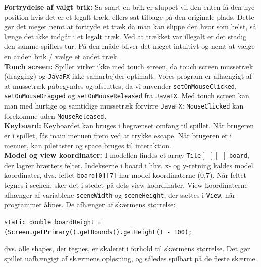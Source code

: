 \textbf{Fortrydelse af valgt brik:} 
Så snart en brik er sluppet vil den enten få den nye position hvis det er et legalt træk, ellers sat tilbage på den originale plads. Dette gør det meget nemt at fortryde et træk da man kan slippe den hvor som helst, så længe det ikke indgår i et legalt træk. Ved at trækket var illegalt er det stadig den samme spillers tur. På den måde bliver det meget intuitivt og nemt at vælge en anden brik / vælge et andet træk. \\

\textbf{Touch screen:} Spillet virker ikke med touch screen, da touch screen mussetræk (dragging) og \texttt{JavaFX} ikke samarbejder optimalt. Vores program er afhængigt af at mussetræk påbegyndes og afsluttes, da vi anvender \texttt{setOnMouseClicked}, \texttt{setOnMouseDragged} og \texttt{setOnMouseReleased} fra \texttt{JavaFX}. Med touch screen kan man med hurtige og samtidige mussetræk forvirre \texttt{JavaFX}: \texttt{MouseClicked} kan forekomme uden \texttt{MouseReleased}.\\

\textbf{Keyboard:} Keyboardet kan bruges i begrænset omfang til spillet. Når brugeren er i spillet, fås main menuen frem ved at trykke escape. Når brugeren er i menuer, kan piletaster og space bruges til interaktion. \\

\textbf{Model og view koordinater:} I modellen findes et array \texttt{Tile}$[\, \, \,][\, \, \,]$ \texttt{board}, der lagrer brættets felter. Indekserne i board i hhv. x- og y-retning kaldes model koordinater, dvs. feltet \texttt{board[0][7]} har model koordinaterne (0,7). Når feltet tegnes i scenen, sker det i stedet på dets view koordinater. View koordinaterne afhænger af variablene \texttt{sceneWidth} og \texttt{sceneHeight}, der sættes i \texttt{View}, når programmet åbnes. De afhænger af skærmens størrelse:
\begin{lstlisting}
static double boardHeight = (Screen.getPrimary().getBounds().getHeight() - 100);
\end{lstlisting}
dvs. alle shapes, der tegnes, er skaleret i forhold til skærmens størrelse. Det gør spillet uafhængigt af skærmens opløsning, og således spilbart på de fleste skærme.\\

